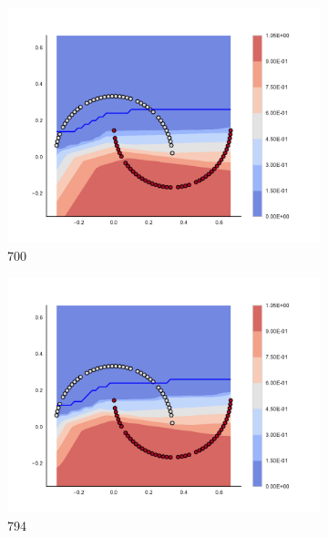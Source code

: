 \begin{figure}[h]
\begin{subfigure}[b]{0.09\textwidth}
    \includegraphics[clip, trim=2.35cm 1.75cm 4.5cm 0cm,width=\textwidth]{img/convergence/700.pdf}
    \caption{700}
    \label{fig:convergence_700}
\end{subfigure}
%
\begin{subfigure}[b]{0.09\textwidth}
    \includegraphics[clip, trim=2.35cm 1.75cm 4.5cm 0cm,width=\textwidth]{img/convergence/794.pdf}
    \caption{794}
    \label{fig:convergence_794}
\end{subfigure}
%
\begin{subfigure}[b]{0.09\textwidth}

\end{subfigure}
\end{figure}
